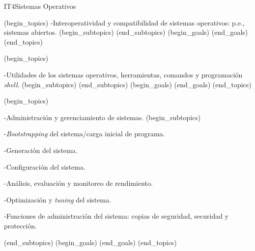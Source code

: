 \begin{BKL2}{IT4}{Sistemas Operativos}
 

(begin_topics)
-Interoperatividad y compatibilidad de sistemas operativos: p.e., sistemas abiertos.
(begin_subtopics)
(end_subtopics)
(begin_goals)
(end_goals)
(end_topics)

 

(begin_topics)

-Utilidades de los sistemas operativos, herramientas, comandos y programación {\it shell}.
(begin_subtopics)
(end_subtopics)
(begin_goals)
(end_goals)
(end_topics)

 

(begin_topics)

-Administración y gerenciamiento de sistemas.
(begin_subtopics)

-{\it Bootstrapping} del sistema/carga inicial de programa.

-Generación del sistema.

-Configuración del sistema.

-Análisis, evaluación y monitoreo de rendimiento.

-Optimización y {\it tuning} del sistema.

-Funciones de administración del sistema: copias de seguridad, securidad y protección.

(end_subtopics)
(begin_goals)
(end_goals)
(end_topics)

\end{BKL2}
 


